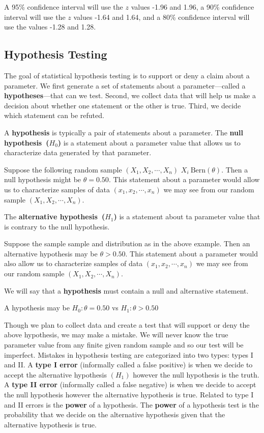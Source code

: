 A 95\% confidence interval will use the $z$ values -1.96 and 1.96, a 90\% confidence interval will use the $z$ values -1.64 and 1.64, and a 80\% confidence interval will use the values -1.28 and 1.28.


\subsection{Hypothesis Testing}

The goal of statistical hypothesis testing is to support or deny a claim about a parameter.
We first generate a set of statements about a parameter---called a \textbf{hypotheses}---that can we test.
Second, we collect data that will help us make a decision about whether one statement or the other is true. 
Third, we decide which statement can be refuted. 

A \textbf{hypothesis} is typically a pair of statements about a parameter. 
The \textbf{null hypothesis~($H_{0}$)} is a statement about a parameter value that allows us to characterize data generated by that parameter.

\ex Suppose the following random sample $(X_{1},X_{2},\cdots,X_{n})$ $X_{i}~\text{Bern}(\theta)$. Then a null hypothesis might be $\theta = 0.50$. This statement about a parameter would allow us to characterize samples of data $(x_{1},x_{2},\cdots,x_{n})$ we may see from our random sample $(X_{1},X_{2},\cdots,X_{n})$. 

The \textbf{alternative hypothesis~($H_{1}$)} is a statement about ta parameter value that is contrary to the null hypothesis. 

\ex Suppose the sample sample and distribution as in the above example. Then an alternative hypothesis may be $\theta > 0.50$. This statement about a parameter would also allow us to characterize samples of data $(x_{1},x_{2},\cdots,x_{n})$ we may see from our random sample $(X_{1},X_{2},\cdots,X_{n})$. 

We will say that a \textbf{hypothesis} must contain a null and alternative statement. 

\ex A hypothesis may be $H_{0}: \theta = 0.50$ vs $H_{1}: \theta > 0.50$

Though we plan to collect data and create a test that will support or deny the above hypothesis, we may make a mistake. We will never know the true parameter value from any finite given random sample and so our test will be imperfect. 
Mistakes in hypothesis testing are categorized into two types: types I and II. 
A \textbf{type I error} (informally called a false positive) is when we decide to accept the alternative hypothesis $(H_{1})$ however the null hypothesis is the truth. 
A \textbf{type II error} (informally called a false negative) is when we decide to accept the null hypothesis however the alternative hypothesis is true.
Related to type I and II errors is the \textbf{power} of a hypothesis.
The \textbf{power} of a hypothesis test is the probability that we decide on the alternative hypothesis given that the alternative hypothesis is true.


